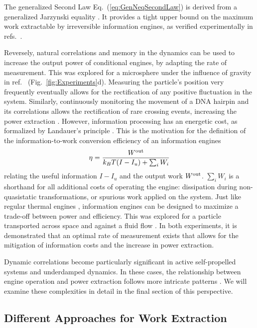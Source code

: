\documentclass[aps, twocolumn,floatfix,showpacs, superscriptaddress]{revtex4-2}
\newcommand{\ie}{information engines }
\begin{document}
The generalized Second Law Eq.~(\ref{eq:GenNeqSecondLaw}) is derived from a generalized Jarzynski equality \cite{ashida_general_2014}.
It provides a tight upper bound on the maximum work extractable by irreversible information engines, as verified experimentally in refs.~\cite{paneru_lossless_2018, archambault2024first}.

Reversely, natural correlations and memory in the dynamics can be used to increase the output power of conditional engines, by adapting the rate of measurement.
This was explored for a microsphere under the influence of gravity in ref.~\cite{saha2021maximizing} (Fig.~\ref{fig:Experiments}d).
Measuring the particle's position very frequently eventually allows for the rectification of any positive fluctuation in the system.
Similarly, continuously monitoring the movement of a DNA hairpin and its correlations allows the rectification of rare crossing events, increasing the power extraction \cite{Ribezzi_Crivellari_2019}.
However, information processing has an energetic cost, as formalized by Landauer's principle \cite{Parrondo_2015}.
This is the motivation for the definition of the information-to-work conversion efficiency of an \ie
\begin{equation}
    \eta = \frac{W^{\rm out}}{k_B T (I-I_u) + \sum_i W_i}
\end{equation}
relating the useful information $I-I_u$ and the output work $W^{\rm out}$.  $\sum_i W_i$ is a shorthand for all additional costs of operating the engine: dissipation during non-quasistatic transformations, or spurious work applied on the system.
Just like regular thermal engines \cite{schmiedl2007efficiency}, \ie can be designed to maximize a trade-off between power and efficiency.
This was explored for a particle transported across space \cite{lee_experimentally-achieved_2018} and against a fluid flow \cite{admon_experimental_2018}.
In both experiments, it is demonstrated that an optimal rate of measurement exists that allows for the mitigation of information costs and the increase in power extraction.

Dynamic correlations become particularly significant in active self-propelled systems and underdamped dynamics. In these cases, the relationship between engine operation and power extraction follows more intricate patterns \cite{archambault2024inertial, archambault2024first, saha2021maximizing}. We will examine these complexities in detail in the final section of this perspective.


\subsection{Different Approaches for Work Extraction}
\end{document}
